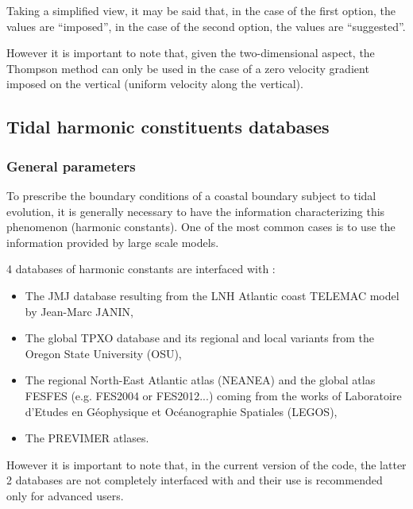 Taking a simplified view, it may be said that, in the case of the first
option, the values are ``imposed'', in the case of the second option, the
values are ``suggested''.

However it is important to note that, given the two-dimensional aspect, the
Thompson method can only be used in the case of a zero velocity gradient
imposed on the vertical (uniform velocity along the vertical).


\subsection{Tidal harmonic constituents databases}
\label{sec:tide}


\subsubsection{General parameters}

To prescribe the boundary conditions of a coastal boundary subject to tidal
evolution, it is generally necessary to have the information characterizing
this phenomenon (harmonic constants). One of the most common cases is to use
the information provided by large scale models.

4 databases of harmonic constants are interfaced with :

\begin{itemize}
\item The JMJ database resulting from the LNH Atlantic coast TELEMAC model
by Jean-Marc JANIN,

\item The global TPXO database and its regional and local variants from
the Oregon State University (OSU),

\item The regional North-East Atlantic atlas (NEANEA) and the global atlas
FESFES (e.g. FES2004 or FES2012...) coming from the works of Laboratoire
d'Etudes en Géophysique et Océanographie Spatiales (LEGOS),

\item The PREVIMER atlases.
\end{itemize}

However it is important to note that, in the current version of the code, the
latter 2 databases are not completely interfaced with  and their use
is recommended only for advanced users.

